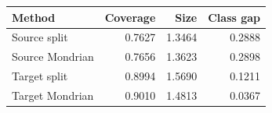 \begin{tabular}{lrrr}
\toprule
Method & Coverage & Size & Class gap \\
\midrule
Source split & 0.7627 & 1.3464 & 0.2888 \\
Source Mondrian & 0.7656 & 1.3623 & 0.2898 \\
Target split & 0.8994 & 1.5690 & 0.1211 \\
Target Mondrian & 0.9010 & 1.4813 & 0.0367 \\
\bottomrule
\end{tabular}
